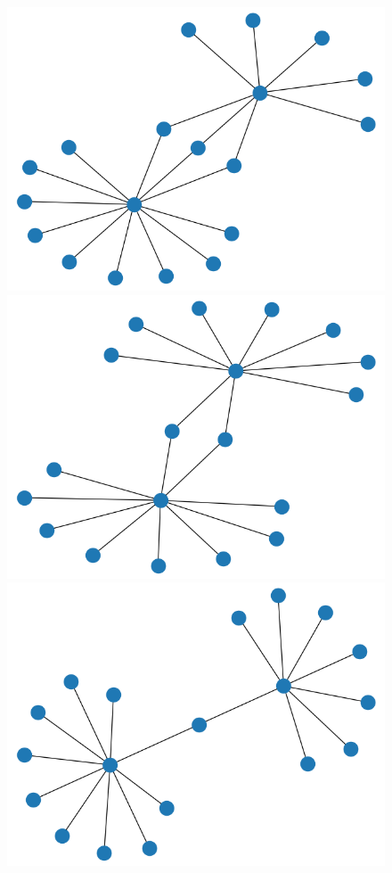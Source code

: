 \documentclass[11pt,english]{article}
\theoremstyle{plain}
\theoremstyle{remark}
\begin{document}
\begin{figure}[hbt]
    \includegraphics[scale=0.2]{timeline/state11.png}
    \includegraphics[scale=0.2]{timeline/state12.png}
    \includegraphics[scale=0.2]{timeline/state13.png}

\end{figure}
\end{document}
